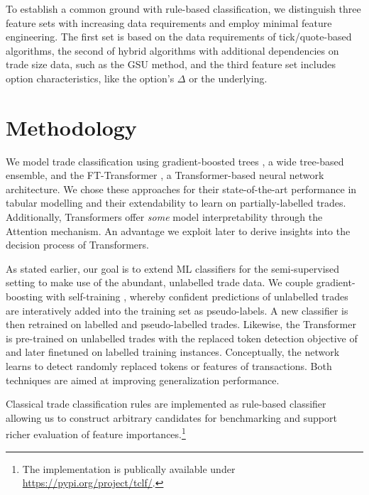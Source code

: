 To establish a common ground with rule-based classification, we distinguish three feature sets with increasing data requirements and employ minimal feature engineering. The first set is based on the data requirements of tick/quote-based algorithms, the second of hybrid algorithms with additional dependencies on trade size data, such as the \gls{GSU} method, and the third feature set includes option characteristics, like the option's $\Delta$ or the underlying. 

\section{Methodology}

We model trade classification using gradient-boosted trees \autocites[][]{friedmanGreedyFunctionApproximation2001}, a wide tree-based ensemble, and the FT-Transformer \autocite{gorishniyRevisitingDeepLearning2021}, a Transformer-based neural network architecture. We chose these approaches for their state-of-the-art performance in tabular modelling \autocites[][]{gorishniyRevisitingDeepLearning2021}[][]{grinsztajnWhyTreebasedModels2022} and their extendability to learn on partially-labelled trades. Additionally, Transformers offer \textit{some} model interpretability through the Attention mechanism. An advantage we exploit later to derive insights into the decision process of Transformers.

As stated earlier, our goal is to extend \gls{ML} classifiers for the semi-supervised setting to make use of the abundant, unlabelled trade data. We couple gradient-boosting with self-training \autocite{yarowskyUnsupervisedWordSense1995}, whereby confident predictions of unlabelled trades are interatively added into the training set as pseudo-labels. A new classifier is then retrained on labelled and pseudo-labelled trades. Likewise, the Transformer is pre-trained on unlabelled trades with the replaced token detection objective of \textcite{clarkElectraPretrainingText2020} and later finetuned on labelled training instances. Conceptually, the network learns to detect randomly replaced tokens or features of transactions. Both techniques are aimed at improving generalization performance.

Classical trade classification rules are implemented as rule-based classifier allowing us to construct arbitrary candidates for benchmarking and support richer evaluation of feature importances.\footnote{The implementation is publically available under \url{https://pypi.org/project/tclf/}.}

